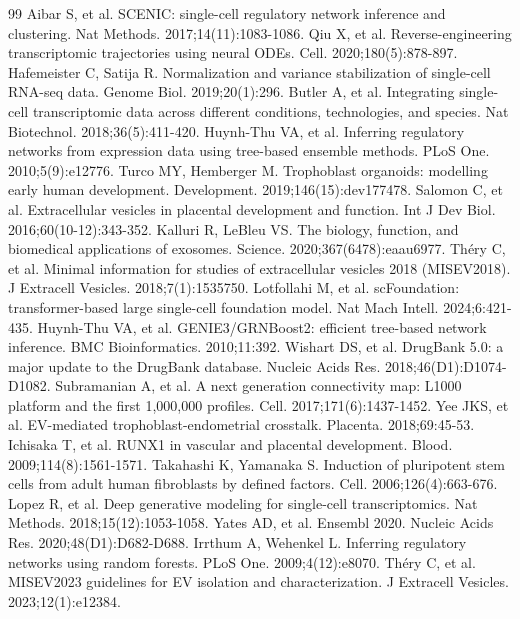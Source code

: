 \documentclass[11pt,a4paper]{article}
\begin{document}

\begin{thebibliography}{99}
 Aibar S, et al. SCENIC: single-cell regulatory network inference and clustering. Nat Methods. 2017;14(11):1083-1086.
 Qiu X, et al. Reverse-engineering transcriptomic trajectories using neural ODEs. Cell. 2020;180(5):878-897.
 Hafemeister C, Satija R. Normalization and variance stabilization of single-cell RNA-seq data. Genome Biol. 2019;20(1):296.
 Butler A, et al. Integrating single-cell transcriptomic data across different conditions, technologies, and species. Nat Biotechnol. 2018;36(5):411-420.
 Huynh-Thu VA, et al. Inferring regulatory networks from expression data using tree-based ensemble methods. PLoS One. 2010;5(9):e12776.
 Turco MY, Hemberger M. Trophoblast organoids: modelling early human development. Development. 2019;146(15):dev177478.
 Salomon C, et al. Extracellular vesicles in placental development and function. Int J Dev Biol. 2016;60(10-12):343-352.
 Kalluri R, LeBleu VS. The biology, function, and biomedical applications of exosomes. Science. 2020;367(6478):eaau6977.
 Théry C, et al. Minimal information for studies of extracellular vesicles 2018 (MISEV2018). J Extracell Vesicles. 2018;7(1):1535750.
 Lotfollahi M, et al. scFoundation: transformer-based large single-cell foundation model. Nat Mach Intell. 2024;6:421-435.
 Huynh-Thu VA, et al. GENIE3/GRNBoost2: efficient tree-based network inference. BMC Bioinformatics. 2010;11:392.
 Wishart DS, et al. DrugBank 5.0: a major update to the DrugBank database. Nucleic Acids Res. 2018;46(D1):D1074-D1082.
 Subramanian A, et al. A next generation connectivity map: L1000 platform and the first 1,000,000 profiles. Cell. 2017;171(6):1437-1452.
 Yee JKS, et al. EV-mediated trophoblast-endometrial crosstalk. Placenta. 2018;69:45-53.
 Ichisaka T, et al. RUNX1 in vascular and placental development. Blood. 2009;114(8):1561-1571.
 Takahashi K, Yamanaka S. Induction of pluripotent stem cells from adult human fibroblasts by defined factors. Cell. 2006;126(4):663-676.
 Lopez R, et al. Deep generative modeling for single-cell transcriptomics. Nat Methods. 2018;15(12):1053-1058.
 Yates AD, et al. Ensembl 2020. Nucleic Acids Res. 2020;48(D1):D682-D688.
 Irrthum A, Wehenkel L. Inferring regulatory networks using random forests. PLoS One. 2009;4(12):e8070.
 Théry C, et al. MISEV2023 guidelines for EV isolation and characterization. J Extracell Vesicles. 2023;12(1):e12384.
\end{thebibliography}
\end{document}
